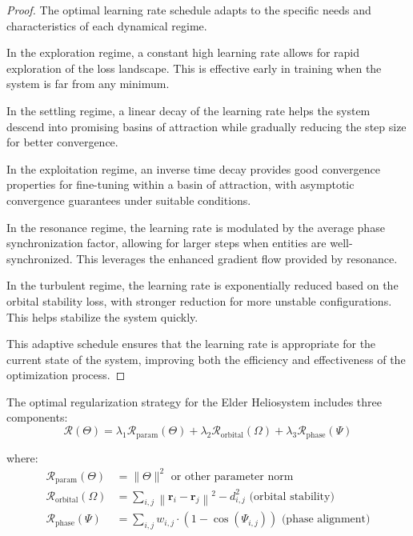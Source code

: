 \begin{proof}
The optimal learning rate schedule adapts to the specific needs and characteristics of each dynamical regime.

In the exploration regime, a constant high learning rate allows for rapid exploration of the loss landscape. This is effective early in training when the system is far from any minimum.

In the settling regime, a linear decay of the learning rate helps the system descend into promising basins of attraction while gradually reducing the step size for better convergence.

In the exploitation regime, an inverse time decay provides good convergence properties for fine-tuning within a basin of attraction, with asymptotic convergence guarantees under suitable conditions.

In the resonance regime, the learning rate is modulated by the average phase synchronization factor, allowing for larger steps when entities are well-synchronized. This leverages the enhanced gradient flow provided by resonance.

In the turbulent regime, the learning rate is exponentially reduced based on the orbital stability loss, with stronger reduction for more unstable configurations. This helps stabilize the system quickly.

This adaptive schedule ensures that the learning rate is appropriate for the current state of the system, improving both the efficiency and effectiveness of the optimization process.
\end{proof}

\begin{theorem}
The optimal regularization strategy for the Elder Heliosystem includes three components:
\begin{equation}
\mathcal{R}(\Theta) = \lambda_1 \mathcal{R}_{\text{param}}(\Theta) + \lambda_2 \mathcal{R}_{\text{orbital}}(\Omega) + \lambda_3 \mathcal{R}_{\text{phase}}(\Psi)
\end{equation}

where:
\begin{align}
\mathcal{R}_{\text{param}}(\Theta) &= \|\Theta\|^2 \text{ or other parameter norm} \\
\mathcal{R}_{\text{orbital}}(\Omega) &= \sum_{i,j} \left\|\mathbf{r}_i - \mathbf{r}_j\right\|^2 - d_{i,j}^2 \text{ (orbital stability)} \\
\mathcal{R}_{\text{phase}}(\Psi) &= \sum_{i,j} w_{i,j} \cdot (1 - \cos(\Psi_{i,j})) \text{ (phase alignment)}
\end{align}
\end{theorem}

